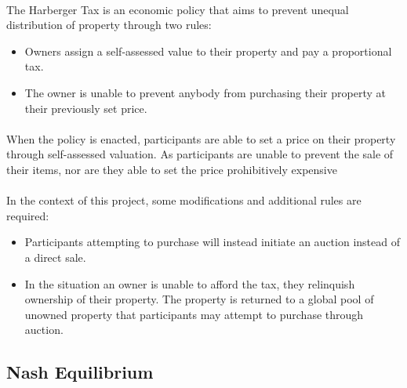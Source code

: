 
\paragraph{} The Harberger Tax is an economic policy that aims to prevent unequal distribution of property through two rules:

\begin{itemize}
  \item Owners assign a self-assessed value to their property and pay a proportional tax. 
  \item The owner is unable to prevent anybody from purchasing their property at their previously set price.
\end{itemize}


\paragraph{} When the policy is enacted, participants are able to set a price on their property through self-assessed valuation. As participants are unable to prevent the sale of their items, nor are they able to set the price prohibitively expensive

\paragraph{} In the context of this project, some modifications and additional rules are required:

\begin{itemize}
  \item Participants attempting to purchase will instead initiate an auction instead of a direct sale.
  \item In the situation an owner is unable to afford the tax, they relinquish ownership of their property. The property is returned to a global pool of unowned property that participants may attempt to purchase through auction.
\end{itemize}

\subsection{Nash Equilibrium}

